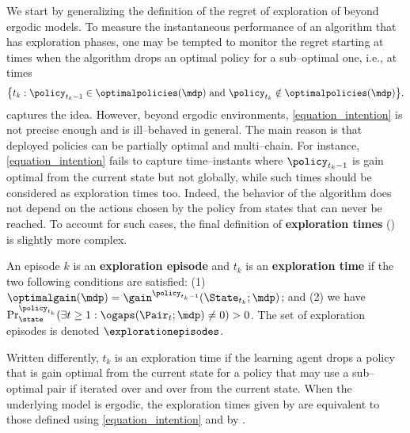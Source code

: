 \documentclass[preprint,cleveref,12pt]{colt2025}
\DeclarePairedDelimiter{\braces}{\{}{\}}	%
\DeclarePairedDelimiter{\parens}{(}{)}	%
\def\model{\mdp}
\def\optpolicies{\optimalpolicies}
\def\optgain{\optimalgain} %
\newcommand{\strong}[1]{\textbf{#1}}
\begin{document}
    We start by generalizing the definition of the regret of exploration of \cite{boone_regret_2023} beyond ergodic models. 
    To measure the instantaneous performance of an algorithm that has exploration phases, one may be tempted to monitor the regret starting at times when the algorithm drops an optimal policy for a sub--optimal one, i.e., at times
    \begin{equation}
    \label{equation_intention}
        \braces*{
            t_k
            : 
            \policy_{t_{k}-1} \in \optpolicies(\model)
            \text{~and~}
            \policy_{t_k} \notin \optpolicies(\model)
        }
        .
    \end{equation}
     captures the idea.
    However, beyond ergodic environments, \eqref{equation_intention} is not precise enough and is ill--behaved in general.
    The main reason is that deployed policies can be partially optimal and multi--chain. 
    For instance, \eqref{equation_intention} fails to capture time--instants where $\policy_{t_k-1}$ is gain optimal from the current state but not globally, while such times should be considered as exploration times too. 
    Indeed, the behavior of the algorithm does not depend on the actions chosen by the policy from states that can never be reached. 
    To account for such cases, the final definition of \strong{exploration times} () is slightly more complex.

    \begin{definition}[Exploration]
    \label{definition_exploration_episode}
    \label{definition_exploration_time}
        An episode $k$ is an \strong{exploration episode} and $t_k$ is an \strong{exploration time} if the two following conditions are satisfied:
        {\upshape (1)} $\optgain(\model) = \gain^{\policy_{t_{k}-1}}(\State_{t_k}; \model)$; 
        and {\upshape (2)} we have $\Pr_{\state}^{\policy_{t_k}} \parens{\exists t \ge 1: \ogaps(\Pair_t; \model) \ne 0} > 0$.
        The set of exploration episodes is denoted $\explorationepisodes$.
    \end{definition}

    Written differently, $t_k$ is an exploration time if the learning agent drops a policy that is gain optimal from the current state for a policy that may use a sub--optimal pair if iterated over and over from the current state.
    When the underlying model is ergodic, the exploration times given by  are equivalent to those defined using \eqref{equation_intention} and by \cite{boone_regret_2023}.
\end{document}
